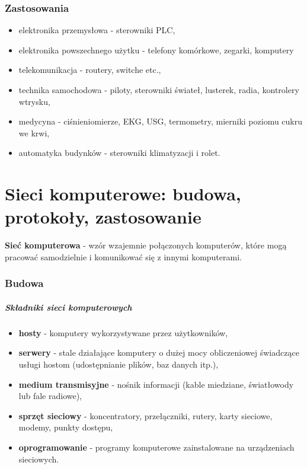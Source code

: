 \documentclass[a4paper,twoside]{report}
\begin{document}
\subsection{Zastosowania}
\begin{itemize}
\item elektronika przemysłowa - sterowniki PLC,
\item elektronika powszechnego użytku - telefony komórkowe, zegarki, komputery
\item telekomunikacja - routery, switche etc.,
\item technika samochodowa - piloty, sterowniki świateł, lusterek, radia, kontrolery wtrysku,
\item medycyna - ciśnieniomierze, EKG, USG, termometry, mierniki poziomu cukru we krwi,
\item automatyka budynków - sterowniki klimatyzacji i rolet.
\end{itemize}

\chapter{Sieci komputerowe: budowa, protokoły, zastosowanie}

\textbf{Sieć komputerowa} - wzór wzajemnie połączonych komputerów, które mogą pracować samodzielnie i komunikować się z innymi komputerami.

\subsection{Budowa}

\paragraph{Składniki sieci komputerowych}
\begin{itemize}
\item \textbf{hosty} - komputery wykorzystywane przez użytkowników,
\item \textbf{serwery} - stale działające komputery o dużej mocy obliczeniowej świadczące usługi hostom (udostępnianie plików, baz danych itp.),
\item \textbf{medium transmisyjne} - nośnik informacji (kable miedziane, światłowody lub fale radiowe),
\item \textbf{sprzęt sieciowy} - koncentratory, przełączniki, rutery, karty sieciowe, modemy, punkty dostępu,
\item \textbf{oprogramowanie} - programy komputerowe zainstalowane na urządzeniach sieciowych.
\end{itemize}
\end{document}
